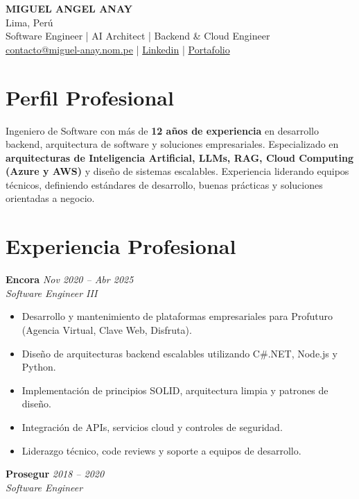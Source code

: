 \documentclass[11pt,a4paper]{article}
\begin{document}
\begin{center}
{\Large \textbf{MIGUEL ANGEL ANAY}}\\
Lima, Perú\\
Software Engineer | AI Architect | Backend \& Cloud Engineer\\
\href{mailto:contacto@miguel-anay.nom.pe}{contacto@miguel-anay.nom.pe} \;|\;
\href{https://www.linkedin.com/in/miguel-anay/}{Linkedin} \;|\;
\href{https://portfolio.miguel-anay.nom.pe}{Portafolio}
\end{center}

\vspace{0.3cm}

\section*{Perfil Profesional}

Ingeniero de Software con más de \textbf{12 años de experiencia} en desarrollo backend, arquitectura de software y soluciones empresariales. Especializado en \textbf{arquitecturas de Inteligencia Artificial, LLMs, RAG, Cloud Computing (Azure y AWS)} y diseño de sistemas escalables. Experiencia liderando equipos técnicos, definiendo estándares de desarrollo, buenas prácticas y soluciones orientadas a negocio.

\section*{Experiencia Profesional}

\textbf{Encora} \hfill \textit{Nov 2020 – Abr 2025}\\
\textit{Software Engineer III}

\begin{itemize}
  \item Desarrollo y mantenimiento de plataformas empresariales para Profuturo (Agencia Virtual, Clave Web, Disfruta).
  \item Diseño de arquitecturas backend escalables utilizando C\#.NET, Node.js y Python.
  \item Implementación de principios SOLID, arquitectura limpia y patrones de diseño.
  \item Integración de APIs, servicios cloud y controles de seguridad.
  \item Liderazgo técnico, code reviews y soporte a equipos de desarrollo.
\end{itemize}

\textbf{Prosegur} \hfill \textit{2018 – 2020}\\
\textit{Software Engineer}
\end{document}
